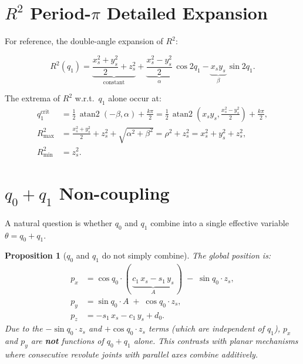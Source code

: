 \documentclass[11pt,a4paper]{article}
\newtheorem{proposition}[theorem]{Proposition}
\DeclareMathOperator{\atantwo}{atan2}
\begin{document}
\section{$R^2$ Period-$\pi$ Detailed Expansion}\label{sec:R2_detail}

For reference, the double-angle expansion of $R^2$:

\begin{equation}\label{eq:R2_double}
  R^2(q_1) = \underbrace{\frac{x_s^2+y_s^2}{2} + z_s^2}_{\text{constant}}
  + \underbrace{\frac{x_s^2-y_s^2}{2}}_{\alpha}\,\cos 2q_1
  - \underbrace{x_s y_s}_{\beta}\,\sin 2q_1.
\end{equation}

The extrema of $R^2$ w.r.t.\ $q_1$ alone occur at:
\begin{align}
  q_1^\text{crit} &= \frac12\,\atantwo(-\beta, \alpha) + \frac{k\pi}{2}
  = \frac12\,\atantwo(x_s y_s, \tfrac{x_s^2-y_s^2}{2}) + \frac{k\pi}{2}, \\
  R^2_\text{max} &= \frac{x_s^2+y_s^2}{2} + z_s^2
    + \sqrt{\alpha^2+\beta^2}
  = \rho^2 + z_s^2 = x_s^2 + y_s^2 + z_s^2, \\
  R^2_\text{min} &= z_s^2.
\end{align}


\section{$q_0 + q_1$ Non-coupling}\label{sec:q0q1}

A natural question is whether $q_0$ and $q_1$ combine into a single
effective variable $\theta = q_0 + q_1$.

\begin{proposition}[$q_0$ and $q_1$ do not simply combine]\label{prop:no_combine}
The global position is:
\begin{align}
  p_x &= \cos q_0 \cdot (\,\underbrace{c_1\,x_s - s_1\,y_s}_{A}\,)
       \;-\; \sin q_0 \cdot z_s, \label{eq:px_full}\\
  p_y &= \sin q_0 \cdot A \;+\; \cos q_0 \cdot z_s, \\
  p_z &= -s_1\,x_s - c_1\,y_s + d_0.
\end{align}
Due to the $-\sin q_0 \cdot z_s$ and $+\cos q_0 \cdot z_s$ terms
(which are independent of $q_1$), $p_x$ and $p_y$ are \textbf{not}
functions of $q_0 + q_1$ alone. This contrasts with planar mechanisms
where consecutive revolute joints with parallel axes combine additively.
\end{proposition}
\end{document}
